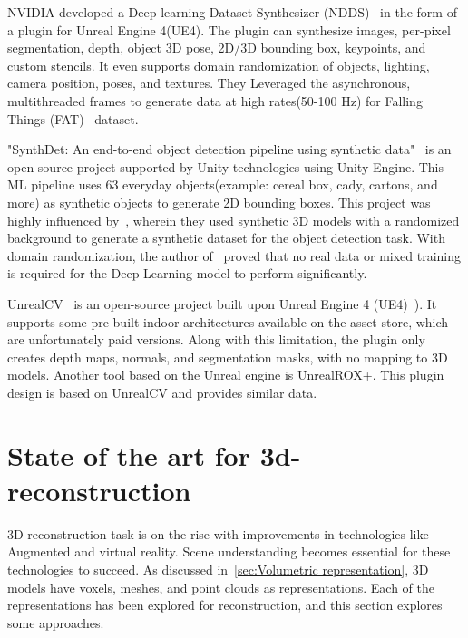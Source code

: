 NVIDIA developed a Deep learning Dataset Synthesizer (NDDS)~\cite{to2018ndds} in the form of a plugin for Unreal Engine 4(UE4).
The plugin can synthesize images, per-pixel segmentation, depth, object 3D pose, 2D/3D bounding box, keypoints, and custom stencils.
It even supports domain randomization of objects, lighting, camera position, poses, and textures.
They Leveraged the asynchronous, multithreaded frames to generate data at high rates(50-100 Hz) for Falling Things (FAT)~\cite{tremblay2018falling} dataset.

"SynthDet: An end-to-end object detection pipeline using synthetic data"~\cite{synthdet2020} is an open-source project supported by Unity technologies using Unity Engine.
This ML pipeline uses 63 everyday objects(example: cereal box, cady, cartons, and more) as synthetic objects to generate 2D bounding boxes.
This project was highly influenced by~\cite{hinterstoisser2019annotation}, wherein they used synthetic 3D models with a randomized background to generate a synthetic dataset for the object detection task.
With domain randomization, the author of~\cite{hinterstoisser2019annotation} proved that no real data or mixed training is required for the Deep Learning model to perform significantly.

UnrealCV~\cite{qiu2017unrealcv} is an open-source project built upon Unreal Engine 4 (UE4)~\cite{unrealengine}).
It supports some pre-built indoor architectures available on the asset store, which are unfortunately paid versions.
Along with this limitation, the plugin only creates depth maps, normals, and segmentation masks, with no mapping to 3D models.
Another tool based on the Unreal engine is UnrealROX+\cite{martinezgonzalez2021unrealrox}.
This plugin design is based on UnrealCV and provides similar data.

\section{State of the art for 3d-reconstruction}\label{sec:state_of_the_art}

3D reconstruction task is on the rise with improvements in technologies like Augmented and virtual reality.
Scene understanding becomes essential for these technologies to succeed.
As discussed in~\ref{sec:Volumetric representation}, 3D models have voxels, meshes, and point clouds as representations.
Each of the representations has been explored for reconstruction, and this section explores some approaches.

